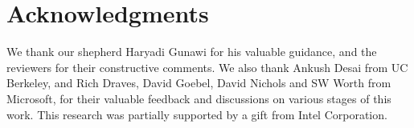 \documentclass[letterpaper,twocolumn,10pt]{article}
\begin{document}


\section{Acknowledgments}

We thank our shepherd Haryadi Gunawi for his valuable guidance, and the reviewers for their constructive comments. We also thank Ankush Desai from UC Berkeley, and Rich Draves, David Goebel, David Nichols and SW Worth from Microsoft, for their valuable feedback and discussions on various stages of this work. This research was partially supported by a gift from Intel Corporation.

\balance

{\footnotesize 
}
\end{document}
